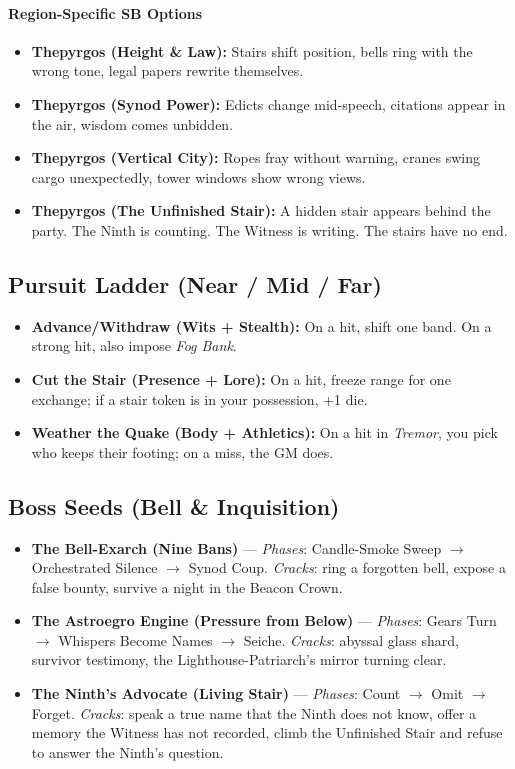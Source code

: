 \paragraph{Region-Specific SB Options}
\begin{itemize}
\item \textbf{Thepyrgos (Height \& Law):} Stairs shift position, bells ring with the wrong tone, legal papers rewrite themselves.
\item \textbf{Thepyrgos (Synod Power):} Edicts change mid-speech, citations appear in the air, wisdom comes unbidden.
\item \textbf{Thepyrgos (Vertical City):} Ropes fray without warning, cranes swing cargo unexpectedly, tower windows show wrong views.
\item \textbf{Thepyrgos (The Unfinished Stair):} A hidden stair appears behind the party. The Ninth is counting. The Witness is writing. The stairs have no end.
\end{itemize}

\subsection*{Pursuit Ladder (Near / Mid / Far)}
\begin{itemize}
\item \textbf{Advance/Withdraw (Wits + Stealth):} On a hit, shift one band. On a strong hit, also impose \emph{Fog Bank}.
\item \textbf{Cut the Stair (Presence + Lore):} On a hit, freeze range for one exchange; if a stair token is in your possession, +1 die.
\item \textbf{Weather the Quake (Body + Athletics):} On a hit in \emph{Tremor}, you pick who keeps their footing; on a miss, the GM does.
\end{itemize}

\subsection*{Boss Seeds (Bell \& Inquisition)}
\begin{itemize}
\item \textbf{The Bell-Exarch (Nine Bans)} --- \emph{Phases}: Candle-Smoke Sweep $\rightarrow$ Orchestrated Silence $\rightarrow$ Synod Coup. \emph{Cracks}: ring a forgotten bell, expose a false bounty, survive a night in the Beacon Crown.
\item \textbf{The Astroegro Engine (Pressure from Below)} --- \emph{Phases}: Gears Turn $\rightarrow$ Whispers Become Names $\rightarrow$ Seiche. \emph{Cracks}: abyssal glass shard, survivor testimony, the Lighthouse-Patriarch's mirror turning clear.
\item \textbf{The Ninth's Advocate (Living Stair)} --- \emph{Phases}: Count $\rightarrow$ Omit $\rightarrow$ Forget. \emph{Cracks}: speak a true name that the Ninth does not know, offer a memory the Witness has not recorded, climb the Unfinished Stair and refuse to answer the Ninth's question.
\end{itemize}

